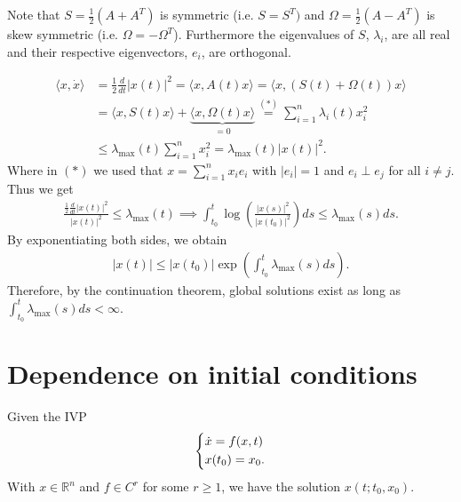 \begin{remark}[]
	Note that  $S = \frac{1}{2}(A + A^T)$ is symmetric (i.e. $S = S^T)$ and $\Omega = \frac{1}{2}(A - A^T)$ is skew symmetric (i.e. $\Omega = -\Omega^T$). Furthermore the eigenvalues of $S$, $\lambda_i$, are all real and their respective eigenvectors, $e_i$, are orthogonal.
\end{remark}

\begin{ex}
\begin{align}
	\langle x, \dot{x} \rangle &= \frac{1}{2} \frac{d}{dt} |x(t)|^2 = \langle x, A(t) x\rangle = \langle x, (S(t) + \Omega(t) ) x \rangle \\
				   &= \langle x, S(t) x \rangle + \underbrace{\langle x, \Omega(t) x \rangle}_{=0} \stackrel{(*)}{=} 
				   \sum_{i=1}^{n} \lambda_i(t) x_i^2 \\
				   &\leq \lambda_{ \textrm{max} }(t) \sum_{i=1}^{n} x_i^2 = \lambda _{ \textrm{max} }(t) | x(t)|^2.
\end{align}
Where in $(*)$ we used that $x = \sum_{i=1}^{n} x_i e_i $ with $|e_i|=1$ and $e_i \perp e_j$ for all $i \neq j$. Thus we get
\begin{align}
	\frac{\frac{1}{2}\frac{d}{dt}|x(t)|^2}{|x(t)|^2} \leq \lambda_{ \textrm{max} }(t) 
	\implies \int_{t_0}^{t} \log \left( \frac{|x(s)|^2}{|x(t_0)|^2} \right) ds \leq \lambda _{ \textrm{max} }(s) ds.
\end{align}
By exponentiating both sides, we obtain
\begin{align}
\boxed{ |x(t)| \leq |x(t_0) | \exp\left(\int_{t_0}^{t} \lambda_{ \textrm{max} }(s)ds\right).}
\end{align}
Therefore, by the continuation theorem, global solutions exist as long as $\int_{t_0}^{t} \lambda_{ \textrm{max} }(s) ds < \infty $.
\end{ex}

\section{Dependence on initial conditions}
Given the IVP
\begin{align}
	\begin{dcases}
	\dot{x} = f(x,t) \\ x(t_0) = x_0.
	\end{dcases}
\end{align}
With $x \in \mathbb{R}^{n}$ and $f\in C^r$ for some $r\geq 1$, we have the solution $x(t; t_0, x_0)$.

